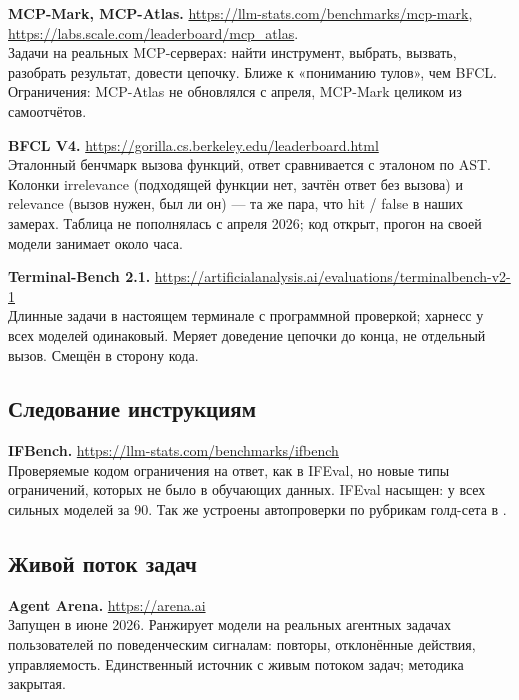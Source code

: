 \documentclass[11pt,a4paper]{article}
\begin{document}
\textbf{MCP-Mark, MCP-Atlas.}
\url{https://llm-stats.com/benchmarks/mcp-mark},
\url{https://labs.scale.com/leaderboard/mcp_atlas}.\\
Задачи на реальных MCP-серверах: найти инструмент, выбрать, вызвать,
разобрать результат, довести цепочку. Ближе к «пониманию тулов», чем
BFCL. Ограничения: MCP-Atlas не обновлялся с апреля, MCP-Mark целиком
из самоотчётов.

\textbf{BFCL V4.} \url{https://gorilla.cs.berkeley.edu/leaderboard.html}\\
Эталонный бенчмарк вызова функций, ответ сравнивается с эталоном по AST.
Колонки irrelevance (подходящей функции нет, зачтён ответ без вызова)
и relevance (вызов нужен, был ли он) --- та же пара, что hit / false
в наших замерах. Таблица не пополнялась с апреля 2026; код открыт,
прогон на своей модели занимает около часа.

\textbf{Terminal-Bench 2.1.}
\url{https://artificialanalysis.ai/evaluations/terminalbench-v2-1}\\
Длинные задачи в настоящем терминале с программной проверкой; харнесс
у всех моделей одинаковый. Меряет доведение цепочки до конца, не отдельный
вызов. Смещён в сторону кода.

\subsection{Следование инструкциям}

\textbf{IFBench.} \url{https://llm-stats.com/benchmarks/ifbench}\\
Проверяемые кодом ограничения на ответ, как в IFEval, но новые типы
ограничений, которых не было в обучающих данных. IFEval насыщен: у всех
сильных моделей за 90. Так же устроены автопроверки по рубрикам
голд-сета в .

\subsection{Живой поток задач}

\textbf{Agent Arena.} \url{https://arena.ai}\\
Запущен в июне 2026. Ранжирует модели на реальных агентных задачах
пользователей по поведенческим сигналам: повторы, отклонённые действия,
управляемость. Единственный источник с живым потоком задач; методика
закрытая.

\vspace{0.5em}
\end{document}
